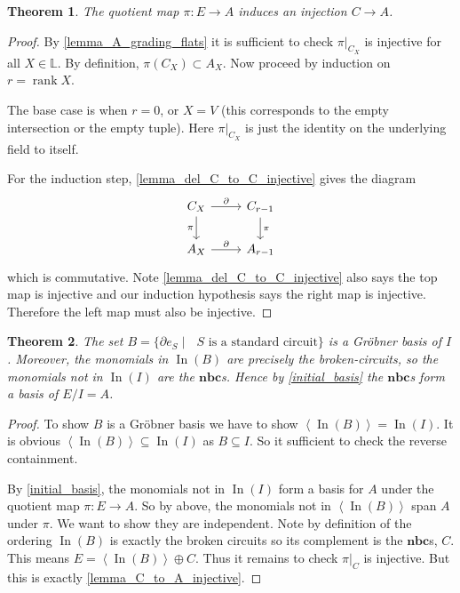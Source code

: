 \documentclass[article,twoside]{article}
\newcommand{\BB}[1]{\mathbb{#1}}
\newcommand{\free}[1]{\!\left\langle#1\right\rangle\!}
\newcommand{\initial}{\operatorname{In}}
\newcommand{\rk}{\operatorname{rank}}
\newcommand{\lattice}{\BB{L}}
\newcommand{\NBC}{$\textbf{nbc}$}
\theoremstyle{plain}
\newtheorem{theorem}{Theorem}[section]
\theoremstyle{plain}
\theoremstyle{plain}
\theoremstyle{plain}
\theoremstyle{plain}
\theoremstyle{definition}
\theoremstyle{definition}
\theoremstyle{definition}
\theoremstyle{remark}
\theoremstyle{remark}
\begin{document}
\begin{theorem}\label{lemma_C_to_A_injective}
	The quotient map $\pi:E\to A$ induces an injection $C\to A$.
\end{theorem}
\begin{proof}
	By \autoref{lemma_A_grading_flats} it is sufficient to check $\pi|_{C_X}$ is injective for all $X\in\lattice$. By definition, $\pi(C_X)\subset A_X$. Now proceed by induction on $r=\rk X$.
	
	The base case is when $r = 0$, or $X = V$ (this corresponds to the empty intersection or the empty tuple). Here $\pi|_{C_X}$ is just the identity on the underlying field to itself.
	
	For the induction step,  \autoref{lemma_del_C_to_C_injective} gives the diagram
	\begin{equation*}
		\begin{tikzcd}
			C_X \rar{\partial}\dar[swap]{\pi}& C_{r-1}\dar{\pi}
			\\
			A_X\rar{\partial} & A_{r-1}
		\end{tikzcd}
	\end{equation*}
	which is commutative. Note \autoref{lemma_del_C_to_C_injective} also says the top map is injective and our induction hypothesis says the right map is injective. Therefore the left map must also be injective.
\end{proof}

\begin{theorem}\label{nbc-basis}
	The set $B=\{\partial e_S \mid \text{ $S$ is a standard circuit}\}$ is a Gr\"obner basis of $I$. Moreover, the monomials in $\initial(B)$ are precisely the broken-circuits, so the monomials not in $\initial(I)$ are the \NBC s. Hence by \autoref{initial_basis} the \NBC s form a basis of $E/I=A$.
\end{theorem}

\begin{proof}
	To show $B$ is a Gr\"obner basis we have to show $\free{\initial(B)} = \initial(I)$. It is obvious $\free{\initial(B)} \subseteq \initial(I)$ as $B\subseteq I$. So it sufficient to check the reverse containment.

	By \autoref{initial_basis}, the monomials not in $\initial(I)$ form a basis for $A$ under the quotient map $\pi:E\to A$. So by above, the monomials not in $\free{\initial(B)}$ span $A$ under $\pi$. We want to show they are independent. Note by definition of the ordering $\initial(B)$ is exactly the broken circuits so its complement is the \NBC s, $C$. This means $E = \free{\initial(B)}\oplus C$. Thus it remains to check $\pi|_C$ is injective. But this is exactly \autoref{lemma_C_to_A_injective}.
\end{proof}
\end{document}
